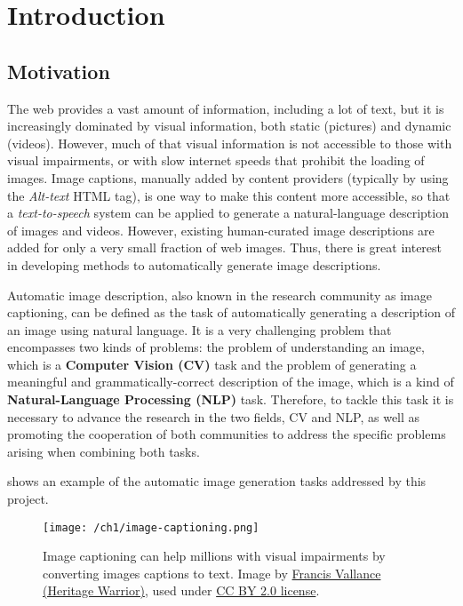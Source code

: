 \chapter{Introduction}
\label{ch:introduccion}

\section{Motivation}

The web provides a vast amount of information, including a lot of text, but it is increasingly dominated by visual information, both static (pictures) and dynamic (videos).  However, much of that visual information is not accessible to those with visual impairments, or with slow internet speeds that prohibit the loading of images. Image captions, manually added by content providers (typically by using the \textit{ Alt-text} HTML tag), is one way to make this content more accessible, so that a \textit{text-to-speech} system can be applied to generate a natural-language description of images and videos. However, existing human-curated image descriptions are added for only a very small fraction of web images. Thus, there is great interest in developing methods to automatically generate image descriptions.

Automatic image description, also known in the research community as image captioning, can be defined as the task of automatically generating a description of an image using natural language. It is a very challenging problem that encompasses two kinds of problems: the problem of understanding an image, which is a \textbf{Computer Vision (CV)} task and the problem of generating a meaningful and grammatically-correct description of the image, which is a kind of \textbf{Natural-Language Processing (NLP)} task. Therefore, to tackle this task it is necessary to advance the research in the two fields, CV and NLP, as well as promoting the cooperation of both communities to address the specific problems arising when combining both tasks.

 shows an example of the automatic image generation tasks addressed by this project.

\begin{figure}[hpt]
    \centering
    \texttt{[image: /ch1/image-captioning.png]}
    \caption{Image captioning can help millions with visual impairments by converting images captions to text. Image by \href{https://www.flickr.com/photos/francisvallance/}{Francis Vallance (Heritage Warrior)}, used under \href{https://creativecommons.org/licenses/by/2.0/}{CC BY 2.0 license}.}
    \label{fig:image-captioning}
\end{figure}

